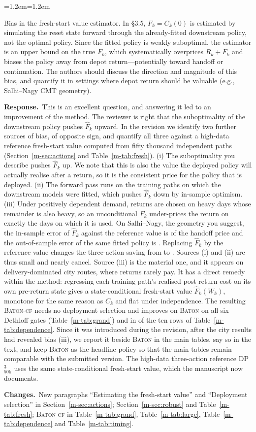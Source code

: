 \documentclass[11pt]{article}
\newenvironment{comment}{\par\medskip\noindent\color{rev}\itshape
  \begin{list}{}{\leftmargin=1.2em\rightmargin=1.2em}\item[]}%
  {\end{list}\par}
\newcommand{\resp}{\par\noindent\textbf{Response.}\ }
\newcommand{\chg}{\par\noindent\textbf{Changes.}\ }
\newcommand{\sref}[1]{Section~\ref{m-#1}}
\newcommand{\tref}[1]{Table~\ref{m-#1}}
\newcommand{\BATON}{\textsc{Baton}}
\begin{document}
\begin{comment}
Bias in the fresh-start value estimator. In \S3.5, $F_k = C_k(0)$ is
estimated by simulating the reset state forward through the
already-fitted downstream policy, not the optimal policy. Since the
fitted policy is weakly suboptimal, the estimator is an upper bound on
the true $F_k$, which systematically overprices $R_k + F_k$ and biases
the policy away from depot return---potentially toward handoff or
continuation. The authors should discuss the direction and magnitude of
this bias, and quantify it in settings where depot return should be
valuable (e.g., Salhi--Nagy CMT geometry).
\end{comment}
\resp This is an excellent question, and answering it led to an
improvement of the method. The reviewer is right that the suboptimality
of the downstream policy pushes $\widehat F_k$ upward. In the revision
we identify two further sources of bias, of opposite sign, and quantify
all three against a high-data reference fresh-start value computed from fifty
thousand independent paths (\sref{sec:actions} and \tref{tab:fresh}).
(i) The suboptimality you describe pushes $\widehat F_k$ up. We note
that this is also the value the deployed policy will actually realise
after a return, so it is the consistent price for the policy that is
deployed. (ii) The forward pass runs on the training paths on which the
downstream models were fitted, which pushes $\widehat F_k$ down by
in-sample optimism. (iii) Under positively dependent demand, returns are
chosen on heavy days whose remainder is also heavy, so an unconditional
$F_k$ under-prices the return on exactly the days on which it is used.
On Salhi--Nagy, the geometry you suggest, the in-sample error of
$\widehat F_k$ against the reference value is \frSalhiBiasIn{} of the
handoff price and the out-of-sample error of the same fitted policy is
\frSalhiBiasOut. Replacing $\widehat F_k$ by the reference value
changes the three-action saving from \frSalhiThree{} to
\frSalhiFstar. Sources (i) and (ii) are thus small and nearly cancel.
Source (iii) is the material one, and it appears on delivery-dominated
city routes, where returns rarely pay. It has a direct remedy within
the method: regressing each training path's realised post-return cost
on its own pre-return state gives a state-conditional fresh-start value
$\widehat F_k(W_k)$, monotone for the same reason as $C_k$ and flat
under independence. The resulting \textsc{Baton-cf} needs no deployment
selection and improves on \BATON{} on all six Dethloff gates
(\tref{tab:grand}) and in \depCfAbove{} of the ten rows of
\tref{tab:dependence}. Since it was introduced during the revision, after
the city results had revealed bias (iii), we report it beside \BATON{} in
the main tables, say so in the text, and keep \BATON{} as the headline
policy so that the main tables remain comparable with the submitted
version. The high-data three-action reference DP$^3_{50\mathrm{k}}$ uses
the same state-conditional fresh-start value, which the manuscript now
documents.
\chg New paragraphs ``Estimating the fresh-start value'' and ``Deployment
selection'' in \sref{sec:actions}; \sref{sec:robust} and
\tref{tab:fresh}; \textsc{Baton-cf} in \tref{tab:grand},
\tref{tab:large}, \tref{tab:dependence} and \tref{tab:timing}.
\end{document}
